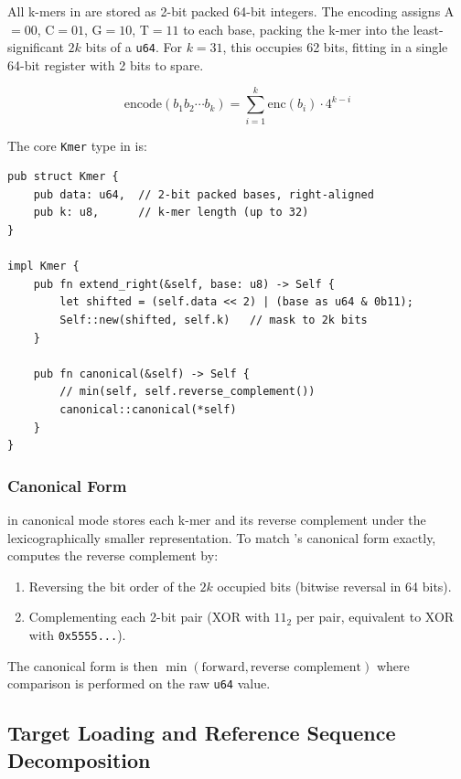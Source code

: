 All k-mers in \kmerdet{} are stored as 2-bit packed 64-bit integers.  The
encoding assigns A$=00$, C$=01$, G$=10$, T$=11$ to each base, packing the
k-mer into the least-significant $2k$ bits of a \texttt{u64}.  For $k = 31$,
this occupies 62 bits, fitting in a single 64-bit register with 2 bits to spare.

\begin{equation}
  \text{encode}(b_1 b_2 \cdots b_k) = \sum_{i=1}^{k} \text{enc}(b_i) \cdot 4^{k-i}
  \label{eq:kmer-encode}
\end{equation}

The core \texttt{Kmer} type in \kmerdet{} is:

\begin{lstlisting}[style=rust, caption={The core Kmer type (src/kmer/mod.rs).}]
pub struct Kmer {
    pub data: u64,  // 2-bit packed bases, right-aligned
    pub k: u8,      // k-mer length (up to 32)
}

impl Kmer {
    pub fn extend_right(&self, base: u8) -> Self {
        let shifted = (self.data << 2) | (base as u64 & 0b11);
        Self::new(shifted, self.k)   // mask to 2k bits
    }

    pub fn canonical(&self) -> Self {
        // min(self, self.reverse_complement())
        canonical::canonical(*self)
    }
}
\end{lstlisting}

\subsubsection{Canonical Form}

\jf{} in canonical mode stores each k-mer and its reverse complement under the
lexicographically smaller representation.  To match \jf{}'s canonical form
exactly, \kmerdet{} computes the reverse complement by:
\begin{enumerate}
  \item Reversing the bit order of the $2k$ occupied bits (bitwise reversal in 64 bits).
  \item Complementing each 2-bit pair (XOR with $11_2$ per pair, equivalent to XOR with \texttt{0x5555...}).
\end{enumerate}
The canonical form is then $\min(\text{forward}, \text{reverse complement})$ where
comparison is performed on the raw \texttt{u64} value.

\subsection{Target Loading and Reference Sequence Decomposition}
\label{sec:target-loading}

